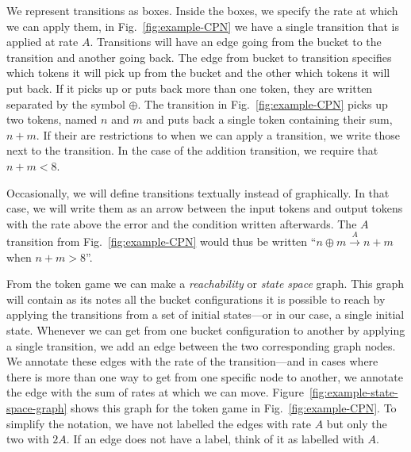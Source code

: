 \documentclass[graybox]{svmult}
\newcommand{\trans}[3]{\ensuremath{#1 \xrightarrow{#2} #3}}
\begin{document}
We represent transitions as boxes. Inside the boxes, we specify the rate at which we can apply them, in Fig.~\ref{fig:example-CPN} we have a single transition that is applied at rate $A$. Transitions will have an edge going from the bucket to the transition and another going back. The edge from bucket to transition specifies which tokens it will pick up from the bucket and the other which tokens it will put back. If it picks up or puts back more than one token, they are written separated by the symbol $\oplus$. The transition in Fig.~\ref{fig:example-CPN} picks up two tokens, named $n$ and $m$ and puts back a single token containing their sum, $n+m$. If their are restrictions to when we can apply a transition, we write those next to the transition. In the case of the addition transition, we require that $n + m < 8$.

Occasionally, we will define transitions textually instead of graphically. In that case, we will write them as an arrow between the input tokens and output tokens with the rate above the error and the condition written afterwards. The $A$ transition from Fig.~\ref{fig:example-CPN} would thus be written ``$\trans{n\oplus m}{A}{n+m}$ when $n+m>8$''.

From the token game we can make a \emph{reachability} or \emph{state space} graph. This graph will contain as its notes all the bucket configurations it is possible to reach by applying the transitions from a set of initial states---or in our case, a single initial state. Whenever we can get from one bucket configuration to another by applying a single transition, we add an edge between the two corresponding graph nodes. We annotate these edges with the rate of the transition---and in cases where there is more than one way to get from one specific node to another, we annotate the edge with the sum of rates at which we can move. Figure~\ref{fig:example-state-space-graph} shows this graph for the token game in Fig.~\ref{fig:example-CPN}. To simplify the notation, we have not labelled the edges with rate $A$ but only the two with $2A$. If an edge does not have a label, think of it as labelled with $A$.
\end{document}
